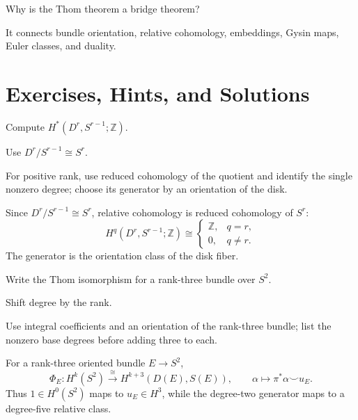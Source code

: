 \begin{problem}
Why is the Thom theorem a bridge theorem?
\end{problem}
\begin{solution}
It connects bundle orientation, relative cohomology, embeddings, Gysin maps, Euler classes, and duality.
\end{solution}

\section{Exercises, Hints, and Solutions}
\begin{exercise}\label{exr:viii31-01}
Compute $H^*(D^r,S^{r-1};\mathbb Z)$.
\end{exercise}
\begin{hint}
Use $D^r/S^{r-1}\cong S^r$.

For positive rank, use reduced cohomology of the quotient and identify the single nonzero degree; choose its generator by an orientation of the disk.
\end{hint}
\begin{solution}
Since \(D^r/S^{r-1}\cong S^r\), relative cohomology is reduced cohomology of \(S^r\):
\[
H^q(D^r,S^{r-1};\mathbb Z)\cong
\begin{cases}\mathbb Z,&q=r,\\0,&q\ne r.\end{cases}
\]
The generator is the orientation class of the disk fiber.
\end{solution}

\begin{exercise}\label{exr:viii31-02}
Write the Thom isomorphism for a rank-three bundle over $S^2$.
\end{exercise}
\begin{hint}
Shift degree by the rank.

Use integral coefficients and an orientation of the rank-three bundle; list the nonzero base degrees before adding three to each.
\end{hint}
\begin{solution}
For a rank-three oriented bundle \(E\to S^2\),
\[
\Phi_E:H^k(S^2)\xrightarrow{\cong}H^{k+3}(D(E),S(E)),
\qquad \alpha\mapsto\pi^*\alpha\smile u_E.
\]
Thus \(1\in H^0(S^2)\) maps to \(u_E\in H^3\), while the degree-two generator maps to a degree-five relative class.
\end{solution}


